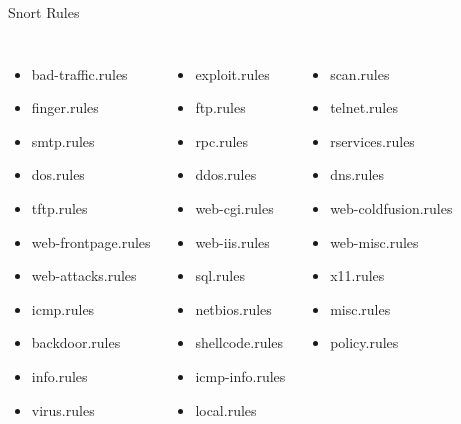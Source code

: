 \begin{frame}[t]{Snort Rules}
  \fontsize{12}{14.5}\selectfont
  \vspace{0.1cm}
  \begin{columns}[T,onlytextwidth]
    \begin{itemize}
      \item bad-traffic.rules
      \item finger.rules
      \item smtp.rules
      \item dos.rules
      \item tftp.rules
      \item web-frontpage.rules
      \item web-attacks.rules
      \item icmp.rules
      \item backdoor.rules
      \item info.rules
      \item virus.rules
    \end{itemize}
    \begin{itemize}
      \item exploit.rules
      \item ftp.rules
      \item rpc.rules
      \item ddos.rules
      \item web-cgi.rules
      \item web-iis.rules
      \item sql.rules
      \item netbios.rules
      \item shellcode.rules
      \item icmp-info.rules
      \item local.rules
    \end{itemize}
    \begin{itemize}
      \item scan.rules
      \item telnet.rules
      \item rservices.rules
      \item dns.rules
      \item web-coldfusion.rules
      \item web-misc.rules
      \item x11.rules
      \item misc.rules
      \item policy.rules
    \end{itemize}
  \end{columns}
\end{frame}

